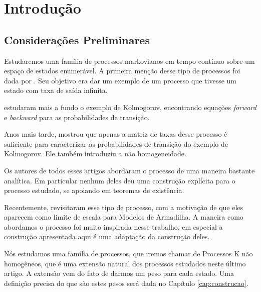\chapter{Introdução}
\label{cap:introducao}

\section{Considerações Preliminares}
\label{sec:consideracoes_preliminares}

Estudaremos uma família de processos markovianos em tempo contínuo
sobre um espaço de estados enumerável. A primeira menção desse tipo de
processos foi dada por \cite{kolmogorov:51}. Seu objetivo era dar um
exemplo de um processo que tivesse um estado com taxa de saída
infinita.

\cite{kendall:56} estudaram mais a fundo o exemplo de Kolmogorov,
encontrando equações \emph{forward} e \emph{backward} para as
probabilidades de transição.

Anos mais tarde, \cite{reuter:69} mostrou que apenas a matriz de taxas
desse processo é suficiente para caracterizar as probabilidades de
transição do exemplo de Kolmogorov. Ele também introduziu a não
homogeneidade.

Os autores de todos esses artigos abordaram o processo de uma maneira
bastante analítica. Em particular nenhum deles deu uma construção
explícita para o processo estudado, se apoiando em teoremas de
existência.

Recentemente, \cite{fontes:08} revisitaram esse tipo de processo,
com a motivação de que eles aparecem como limite de escala para
Modelos de Armadilha. A maneira como abordamos o processo foi muito
inspirada nesse trabalho, em especial a construção apresentada aqui é
uma adaptação da construção deles.


Nós estudamos uma família de processos, que iremos chamar de Processos
K não homogêneos, que é uma extensão natural dos processos estudados
neste último artigo. A extensão vem do fato de darmos um peso para
cada estado. Uma definição precisa do que são estes pesos será dada no
Capítulo \ref{cap:construcao}.

